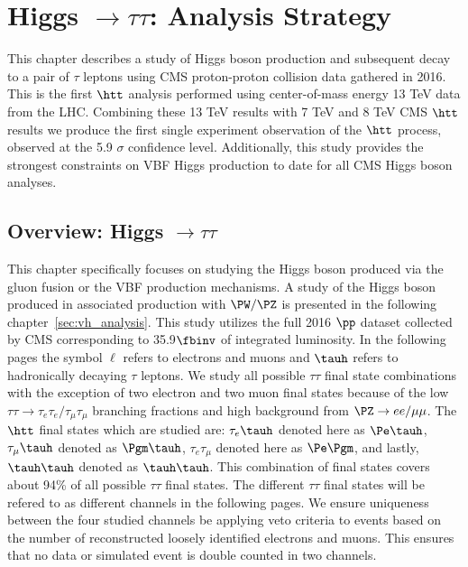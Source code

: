 \chapter{Higgs $\to \tau\tau$: Analysis Strategy}
\label{sec:htt_analysis}

This chapter describes a study of Higgs boson production and subsequent
decay to a pair of $\tau$ leptons using CMS proton-proton collision data gathered in 2016. This is the first
$\htt$ analysis performed using center-of-mass energy 13 TeV data from the LHC. Combining
these 13 TeV results with 7 TeV and 8 TeV CMS $\htt$ results we produce
the first single experiment observation of the $\htt$ process, observed at the 5.9 $\sigma$
confidence level. Additionally, this study provides the strongest constraints on VBF Higgs 
production to date for all CMS Higgs boson analyses.

\section{Overview: Higgs $\to \tau\tau$}

This chapter specifically focuses on studying the Higgs boson produced via the gluon fusion
or the VBF production mechanisms. A study of the Higgs boson produced in associated production with
$\PW/\PZ$ is presented in the following chapter~\ref{sec:vh_analysis}. This study utilizes the
full 2016 $\pp$ dataset collected by CMS corresponding to 35.9$\fbinv$ of integrated luminosity.
In the following pages the symbol $\ell$ refers to electrons and muons and $\tauh$ refers to hadronically
decaying $\tau$ leptons. We study all possible $\tau\tau$ final state combinations with the
exception of two electron and two muon final states because of the low 
$\tau\tau \to \tau_{e}\tau_{e}/\tau_{\mu}\tau_{\mu}$
branching fractions and high background from $\PZ \to ee/\mu\mu$. The $\htt$ final states which are
studied are: $\tau_{e}\tauh$ denoted here as $\Pe\tauh$, $\tau_{\mu}\tauh$ denoted as $\Pgm\tauh$,
$\tau_{e}\tau_{\mu}$ denoted here as $\Pe\Pgm$, and lastly, $\tauh\tauh$ denoted as $\tauh\tauh$.
This combination of final states covers about 94\% of all possible $\tau\tau$ final states.
The different $\tau\tau$ final states will be refered to as different channels in the following pages.
We ensure uniqueness between the four studied channels be applying veto criteria to events based
on the number of reconstructed loosely identified electrons and muons. This ensures that 
no data or simulated event is double counted in two channels.

